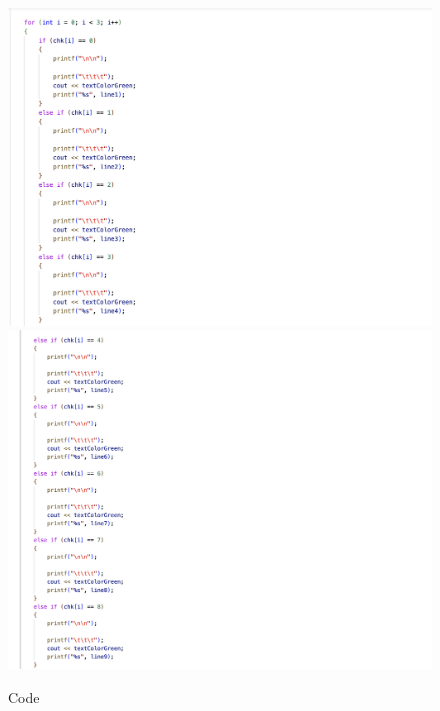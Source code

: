 \begin{figure}[h]
     \includegraphics[scale=0.16]{CodeScreenShot/speedtest-2.png}
     \includegraphics[scale=0.16]{CodeScreenShot/speedtest-3.png}
    \caption{Code}
    \label{fig:code-screenshots}
\end{figure}
